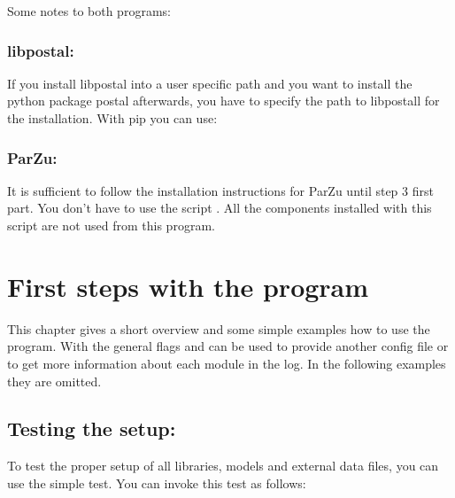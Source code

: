 \documentclass[letterpaper,10pt,english]{sphinxmanual}
\begin{document}
Some notes to both programs:


\subsection{libpostal:}
\label{\detokenize{installation:libpostal}}
If you install libpostal into a user specific path and you want to
install the python package postal afterwards, you have to specify the
path to libpostall for the installation. With pip you can use:

%
\begin{sphinxVerbatim}[commandchars=\\\{\}]
     
\end{sphinxVerbatim}


\subsection{ParZu:}
\label{\detokenize{installation:parzu}}
It is sufficient to follow the installation instructions for ParZu
until step 3 first part. You don’t have to use the script
. All the components installed with this script are
not used from this program.


\chapter{First steps with the program}
\label{\detokenize{tutorial:first-steps-with-the-program}}\label{\detokenize{tutorial::doc}}
This chapter gives a short overview and some simple examples how to
use the program. With the general flags  and
 can be used to provide another config file or to get
more information about each module in the log. In the following
examples they are omitted.


\section{Testing the setup:}
\label{\detokenize{tutorial:testing-the-setup}}
To test the proper setup of all libraries, models and external data
files, you can use the simple test. You can invoke this test as
follows:
\end{document}
